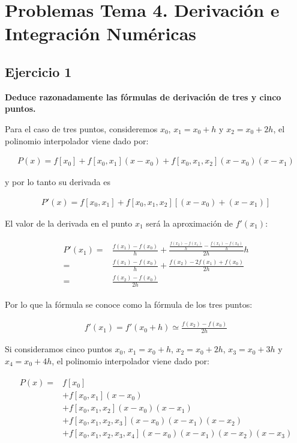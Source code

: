 \documentclass[12pt,a4paper,oneside,draft]{report}
\begin{document}
\chapter{Problemas Tema 4. Derivación e Integración Numéricas}

\section{Ejercicio 1}

\textbf{Deduce razonadamente las fórmulas de derivación de tres y cinco puntos.}

Para el caso de tres puntos, consideremos $x_0$, $x_1 = x_0 + h$ y $x_2 = x_0 + 2h$, el polinomio interpolador viene dado por:

\begin{align}
P(x) = f[x_0] + f[x_0,x_1](x - x_0) + f[x_0,x_1,x_2](x - x_0)(x - x_1)
\end{align}

y por lo tanto su derivada es

\begin{align}
P'(x) = f[x_0,x_1] + f[x_0,x_1,x_2][(x - x_0) + (x - x_1)]
\end{align}

El valor de la derivada en el punto $x_1$ será la aproximación de $f'(x_1)$:

\begin{align}
  \begin{split}
P'(x_1) = & \displaystyle\frac{f(x_1) - f(x_0)}{h} + \displaystyle\frac{\displaystyle\frac{f(x_2)-f(x_1)}{h} - \displaystyle\frac{f(x_1)-f(x_0)}{h}}{2h}h\\
=& \displaystyle\frac{f(x_1) - f(x_0)}{h} + \displaystyle\frac{f(x_2) - 2f(x_1) + f(x_0)}{2h}\\
=& \displaystyle\frac{f(x_2) - f(x_0)}{2h}
  \end{split}
\end{align}

Por lo que la fórmula se conoce como la fórmula de los tres puntos:

\begin{align}
f'(x_1) = f'(x_0 + h) \simeq \displaystyle\frac{f(x_2) - f(x_0)}{2h}
\end{align}

Si consideramos cinco puntos $x_0$, $x_1 = x_0 + h$, $x_2 = x_0 + 2h$, $x_3 = x_0 + 3h$ y $x_4 = x_0 + 4h$, el polinomio interpolador viene dado por:

\begin{align}
  \begin{split}
    P(x) =& f[x_0]\\
    &+ f[x_0, x_1](x - x_0)\\
    &+ f[x_0, x_1, x_2](x - x_0)(x - x_1)\\
    &+ f[x_0, x_1, x_2, x_3](x - x_0)(x - x_1)(x - x_2)\\
    &+ f[x_0, x_1, x_2, x_3, x_4](x - x_0)(x - x_1)(x - x_2)(x - x_3)
  \end{split}
\end{align}
\end{document}
